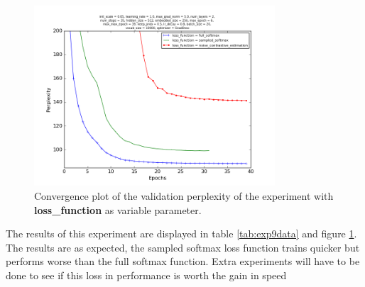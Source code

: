 \documentclass[10pt,a4paper,titlepage]{article}
\begin{document}
\begin{figure}[H]
	\begin{center}
		\includegraphics[width=0.80\textwidth]{Figures/lossperf.png}
		\caption{Convergence plot of the validation perplexity of the experiment with \textbf{loss\_function} as variable parameter. }
		\label{fig:exp9perf}
	\end{center}	
\end{figure}

The results of this experiment are displayed in table \ref{tab:exp9data} and figure \ref{fig:exp9perf}. The results are as expected, the sampled softmax loss function trains quicker but performs worse than the full softmax function. Extra experiments will have to be done to see if this loss in performance is worth the gain in speed

\newpage
\end{document}
